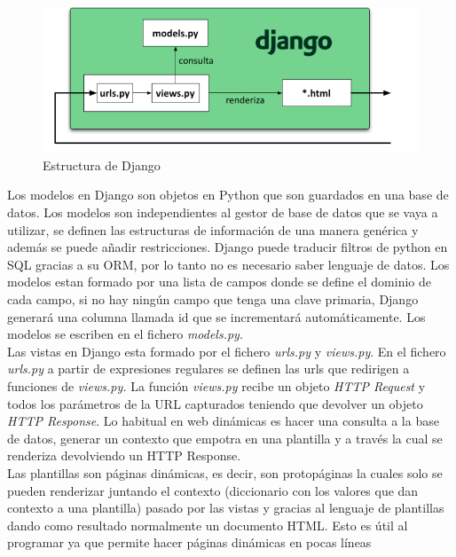 \begin{figure}[H]
    \centering
    \includegraphics[width=12cm, keepaspectratio]{img/django.png}
    \caption{Estructura de Django}
    \label{fig:django}
\end{figure}

Los modelos en Django son objetos en Python que son guardados en una base de datos. Los modelos son independientes al gestor de base de datos que se vaya a utilizar, se definen las estructuras de información de una manera genérica y además se puede añadir restricciones. Django puede traducir filtros de python en SQL gracias a su ORM, por lo tanto no es necesario saber lenguaje de datos. Los modelos estan formado por una lista de campos donde se define el dominio de cada campo, si no hay ningún campo que tenga una clave primaria, Django generará una columna llamada id que se incrementará automáticamente. Los modelos se escriben en el fichero \textit{models.py}.\cite{model}\\

Las vistas en Django esta formado por el fichero \textit{urls.py} y \textit{views.py}. En el fichero\textit{ urls.py} a partir de expresiones regulares se definen las urls que redirigen a funciones de \textit{views.py.} La función \textit{views.py} recibe un objeto \textit{HTTP Request} y todos los parámetros de la URL capturados teniendo que devolver un objeto \textit{HTTP Response}. Lo habitual en web dinámicas es hacer una consulta a la base de datos, generar un contexto que empotra en una plantilla y a través la cual se renderiza devolviendo un HTTP Response.\\

Las plantillas son páginas dinámicas, es decir, son protopáginas la cuales solo se pueden renderizar juntando el contexto (diccionario con los valores que dan contexto a una plantilla) pasado por las vistas y gracias al lenguaje de plantillas dando como resultado normalmente un documento HTML. Esto es útil al programar ya que permite hacer páginas dinámicas en pocas líneas\\


